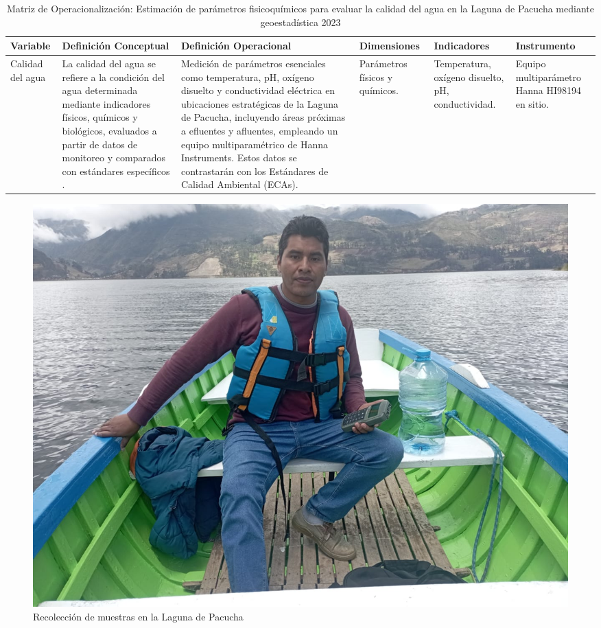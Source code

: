 

\begin{landscape}
\tiny %
\setlength{\tabcolsep}{4pt} %
\renewcommand{\arraystretch}{1.5} %

\begin{table}[ht]
\centering
\caption{Matriz de Operacionalización: Estimación de parámetros fisicoquímicos para evaluar la calidad del agua en la Laguna de Pacucha mediante geoestadística 2023}
\begin{tabularx}{\linewidth}{|X|X|X|X|X|X|}
\hline
\textbf{Variable} & \textbf{Definición Conceptual} & \textbf{Definición Operacional} & \textbf{Dimensiones} & \textbf{Indicadores} & \textbf{Instrumento} \\
\hline
Calidad del agua & La calidad del agua se refiere a la condición del agua determinada mediante indicadores físicos, químicos y biológicos, evaluados a partir de datos de monitoreo y comparados con estándares específicos \cite{Li2019}. & Medición de parámetros esenciales como temperatura, pH, oxígeno disuelto y conductividad eléctrica en ubicaciones estratégicas de la Laguna de Pacucha, incluyendo áreas próximas a efluentes y afluentes, empleando un equipo multiparamétrico de Hanna Instruments. Estos datos se contrastarán con los Estándares de Calidad Ambiental (ECAs). & Parámetros físicos y químicos. & Temperatura, oxígeno disuelto, pH, conductividad. & Equipo multiparámetro Hanna HI98194 en sitio. \\
\hline
\end{tabularx}
\end{table}
\end{landscape}




\begin{figure}
    \centering
    \includegraphics[width=1\linewidth]{Anexos/teybi.jpeg}
    \caption{Recolección de muestras en la Laguna de Pacucha}
    \label{fig:enter-label}
\end{figure}

